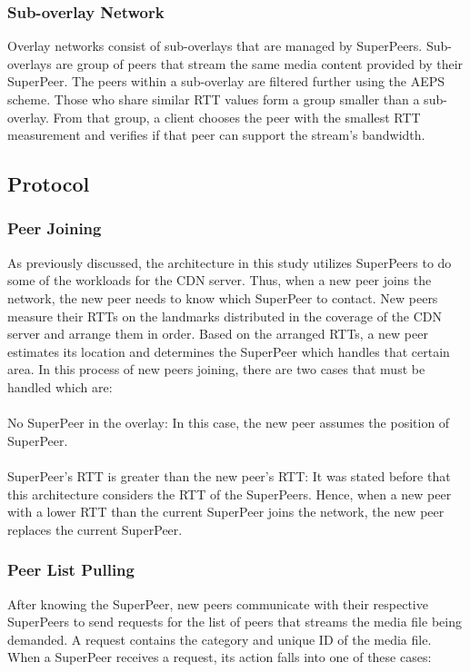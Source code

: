\documentclass[letterpaper, twocolumn, twoside]{IEEEtran}
\begin{document}
\subsubsection{Sub-overlay Network}
Overlay networks consist of sub-overlays that are managed by SuperPeers. Sub-overlays are group of peers that stream the same media content provided by their SuperPeer. The peers within a sub-overlay are filtered further using the AEPS scheme. Those who share similar RTT values form a group smaller than a sub-overlay. From that group, a client chooses the peer with the smallest RTT measurement and verifies if that peer can support the stream’s bandwidth.
\subsection{Protocol}
\subsubsection{Peer Joining}
As previously discussed, the architecture in this study utilizes SuperPeers to do some of the workloads for the CDN server. Thus, when a new peer joins the network, the new peer needs to know which SuperPeer to contact. New peers measure their RTTs on the landmarks distributed in the coverage of the CDN server and arrange them in order. Based on the arranged RTTs, a new peer estimates its location and determines the SuperPeer which handles that certain area. In this process of new peers joining, there are two cases that must be handled which are:
\paragraph{}
No SuperPeer in the overlay: In this case, the new peer assumes the position of SuperPeer.
\paragraph{}
SuperPeer’s RTT is greater than the new peer’s RTT: It was stated before that this architecture considers the RTT of the SuperPeers. Hence, when a new peer with a lower RTT than the current SuperPeer joins the network, the new peer replaces the current SuperPeer.
\subsubsection{Peer List Pulling}
	After knowing the SuperPeer, new peers communicate with their respective SuperPeers to send requests for the list of peers that streams the media file being demanded. A request contains the category and unique ID of the media file. When a SuperPeer receives a request, its action falls into one of these cases:
\end{document}
